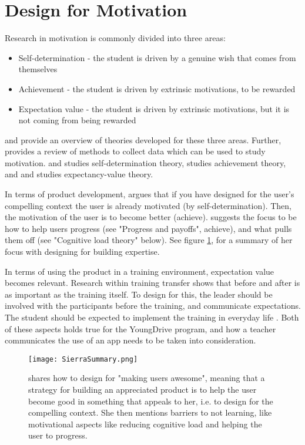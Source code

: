 \section{Design for Motivation}\label{sec:motivation}

Research in motivation is commonly divided into three areas:

\begin{itemize}
\item Self-determination - the student is driven by a genuine wish that comes from themselves
\item Achievement - the student is driven by extrinsic motivations, to be rewarded
\item Expectation value - the student is driven by extrinsic motivations, but it is not coming from being rewarded
\end{itemize}

\cite{koballa} and \cite{abell} provide an overview of theories developed for these three areas. Further, \cite{fulmer} provides a review of methods to collect data which can be used to study motivation. \cite{deci} and \cite{ryan} studies self-determination theory, \cite{elliot} studies achievement theory, and \cite{eccles} and \cite{wigfield} studies expectancy-value theory.

In terms of product development, \cite{sierra} argues that if you have designed for the user's compelling context the user is already motivated (by self-determination). Then, the motivation of the user is to become better (achieve). \cite{sierra} suggests the focus to be how to help users progress (see "Progress and payoffs", achieve), and what pulls them off (see "Cognitive load theory" below). See figure \ref{fig:sierra-summary}, for a summary of her focus with designing for building expertise.

In terms of using the product in a training environment, expectation value becomes relevant. Research within training transfer \citep{brinkerhoff} shows that before and after is as important as the training itself. To design for this, the leader should be involved with the participants before the training, and communicate expectations. The student should be expected to implement the training in everyday life \citep{brinkerhoff}. Both of these aspects holds true for the YoungDrive program, and how a teacher communicates the use of an app needs to be taken into consideration.

\begin{figure}[h]
  \centering
  \texttt{[image: SierraSummary.png]}
  \caption{\cite{sierra} shares how to design for "making users awesome", meaning that a strategy for building an appreciated product is to help the user become good in something that appeals to her, i.e. to design for the compelling context. She then mentions barriers to not learning, like motivational aspects like reducing cognitive load and helping the user to progress.}
  \label{fig:sierra-summary}
\end{figure}

